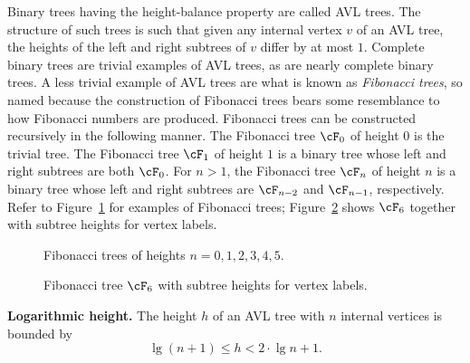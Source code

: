 Binary trees having the height-balance property are called
AVL trees. The structure of such trees is such that
given any internal vertex $v$ of an AVL tree, the heights of the left
and right subtrees of $v$ differ by at most $1$.
Complete binary trees are trivial examples
of AVL trees, as are nearly
complete binary trees. A less trivial example of AVL trees are what is
known as \emph{Fibonacci trees}, so named
because the construction of Fibonacci trees bears some resemblance to
how Fibonacci numbers are produced. Fibonacci
trees can be constructed recursively in the following manner. The
Fibonacci tree $\cF_0$ of height $0$ is the trivial tree. The
Fibonacci tree $\cF_1$ of height $1$ is a binary tree whose left and
right subtrees are both $\cF_0$. For $n > 1$, the Fibonacci tree
$\cF_n$ of height $n$ is a binary tree whose left and right subtrees
are $\cF_{n-2}$ and $\cF_{n-1}$, respectively. Refer to
Figure~\ref{fig:tree_data_structures:Fibonacci_trees_1_to_5} for
examples of Fibonacci trees;
Figure~\ref{fig:tree_data_structures:Fibonacci_tree_F6_subtree_heights}
shows $\cF_6$ together with subtree heights for vertex labels.

\begin{figure}[!htbp]
\centering
{}

\caption{Fibonacci trees of heights $n = 0, 1, 2, 3, 4, 5$.}
\label{fig:tree_data_structures:Fibonacci_trees_1_to_5}
\end{figure}

\begin{figure}[!htbp]
\centering
{}

\caption{Fibonacci tree $\cF_6$ with subtree heights for vertex labels.}
\label{fig:tree_data_structures:Fibonacci_tree_F6_subtree_heights}
\end{figure}

\begin{theorem}
\label{thm:tree_data_structures:AVL_tree_logarithmic_height}
\textbf{Logarithmic height.}
The height $h$ of an AVL tree with $n$ internal vertices is bounded by
\[
\lg(n + 1) \leq h < 2 \cdot \lg n + 1.
\]
\end{theorem}

